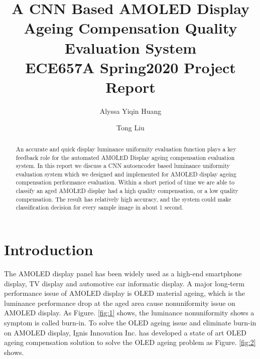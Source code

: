 \documentclass[runningheads]{llncs}
\begin{document}
%
\title{A CNN Based AMOLED Display Ageing Compensation Quality Evaluation System\\
ECE657A Spring2020 Project Report}
%
%
\author{Alyssa Yiqin Huang \and
Tong Liu}
%

%
%
\maketitle              %
%
\begin{abstract}
An accurate and quick display luminance uniformity evaluation function plays a key feedback role for the automated AMOLED Display ageing compensation evaluation system. In this report we discuss a CNN  autoencoder based luminance uniformity evaluation system which we designed and implemented for AMOLED display ageing compensation performance evaluation. Within a short period of time we are able to classify an aged AMOLED display had a high quality compensation, or a low quality compensation. The result has relatively high accuracy, and the system could make classification decision for every sample image in about 1 second.

\end{abstract}
%
%
%
\section{Introduction}
The AMOLED display panel has been widely used as a high-end smartphone display, TV display and automotive car informatic display. A major long-term performance issue of AMOLED display is OLED material ageing, which is the luminance performance drop at the aged area cause nonuniformity issue on AMOLED display.  As Figure. \ref{fig:1} shows, the luminance nonuniformity shows a symptom is called burn-in.
To solve the OLED ageing issue and eliminate burn-in on AMOLED display, Ignis Innovation Inc. has developed a state of art OLED ageing compensation solution to solve the OLED ageing problem as Figure.  \ref{fig:2} shows.
\end{document}
